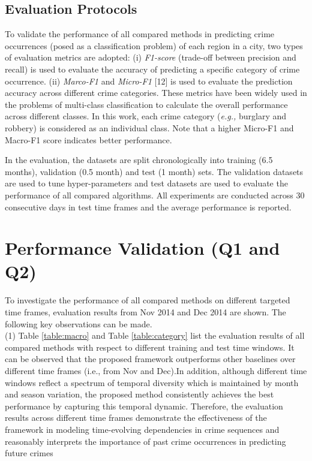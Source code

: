 \subsection{Evaluation Protocols}

To validate the performance of all
compared methods in predicting crime occurrences (posed as a
classification problem) of each region in a city, two types of
evaluation metrics are adopted: (i) \emph{F1-score} (trade-off between precision
and recall) is used to evaluate the accuracy of predicting a specific category
of crime occurrence. (ii) \emph{Marco-F1} and \emph{Micro-F1} [12] is used to
evaluate the prediction accuracy across different crime categories.
These metrics have been widely used in the problems of multi-class
classification to calculate the overall performance across different
classes. In this work, each crime category (\emph{e.g.,} burglary
and robbery) is considered as an individual class. Note that a higher Micro-F1
and Macro-F1 score indicates better performance.

In the evaluation, the datasets are split chronologically into
training (6.5 months), validation (0.5 month) and test (1 month)
sets. The validation datasets are used to tune hyper-parameters and
test datasets are used to evaluate the performance of all compared algorithms. All experiments are conducted across 30 consecutive
days in test time frames and the average performance is reported.

\section{Performance Validation (Q1 and Q2)}

To investigate the performance of all compared methods on different
targeted time frames, evaluation results from Nov 2014
and Dec 2014 are shown. The following key observations can be made.\\
(1) Table \ref{table:macro} and Table \ref{table:category} list the evaluation results of all compared
methods with respect to different training and test time windows.
It can be observed that the proposed framework outperforms other baselines over different time frames (i.e., from Nov and Dec).In addition, although different time windows reflect a
spectrum of temporal diversity which is maintained by month and
season variation, the proposed method consistently achieves the best
performance by capturing this temporal dynamic. Therefore, the
evaluation results across different time frames demonstrate the effectiveness of the framework in modeling time-evolving dependencies
in crime sequences and reasonably interprets the importance of
past crime occurrences in predicting future crimes


